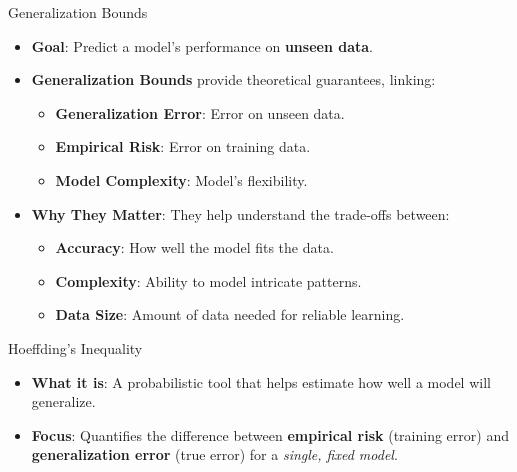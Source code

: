 \documentclass[
  ignorenonframetext,
]{beamer}
\providecommand{\tightlist}{%
  \setlength{\itemsep}{0pt}\setlength{\parskip}{0pt}}\usepackage{longtable,booktabs,array}
\begin{document}
\begin{frame}{Generalization Bounds}
\label{generalization-bounds}
\begin{itemize}
\tightlist
\item
  \textbf{Goal}: Predict a model's performance on \textbf{unseen data}.
\item
  \textbf{Generalization Bounds} provide theoretical guarantees,
  linking:

  \begin{itemize}
  \tightlist
  \item
    \textbf{Generalization Error}: Error on unseen data.
  \item
    \textbf{Empirical Risk}: Error on training data.
  \item
    \textbf{Model Complexity}: Model's flexibility.
  \end{itemize}
\item
  \textbf{Why They Matter}: They help understand the trade-offs between:

  \begin{itemize}
  \tightlist
  \item
    \textbf{Accuracy}: How well the model fits the data.
  \item
    \textbf{Complexity}: Ability to model intricate patterns.
  \item
    \textbf{Data Size}: Amount of data needed for reliable learning.
  \end{itemize}
\end{itemize}
\end{frame}

\begin{frame}{Hoeffding's Inequality}
\label{hoeffdings-inequality}
\begin{itemize}
\tightlist
\item
  \textbf{What it is}: A probabilistic tool that helps estimate how well
  a model will generalize.
\item
  \textbf{Focus}: Quantifies the difference between \textbf{empirical
  risk} (training error) and \textbf{generalization error} (true error)
  for a \emph{single, fixed model}.
\end{itemize}
\end{frame}
\end{document}
